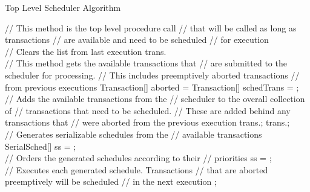 \begin{algorithm}
\caption{Top Level Scheduler Algorithm}
\label{alg:top_level}
\begin{algorithmic}[1]

  \State // This method is the top level procedure call
  \State // that will be called as long as transactions
  \State // are available and need to be scheduled
  \State // for execution
  \\
    \State // Clears the list from last execution
    \State trans.
    \\
    \State // This method gets the available transactions that
    \State // are submitted to the scheduler for processing.
    \State // This includes preemptively aborted transactions
    \State // from previous executions
    \State Transaction[] aborted = 
    \State Transaction[] schedTrans = ;
    \\
    \State // Adds the available transactions from the
    \State // scheduler to the overall collection of
    \State // transactions that need to be scheduled. 
    \State // These are added behind any transactions that
    \State // were aborted from the previous execution
    \State trans.;
    \State trans.;
    \\
    \State // Generates serializable schedules from the 
    \State // available transactions
    \State SerialSched[] ss = ;
    \\
    \State // Orders the generated schedules according to their
    \State // priorities
    \State ss = ;
    \\
    \State // Executes each generated schedule. Transactions
    \State // that are aborted preemptively will be scheduled
    \State // in the next execution
      \State {};
    \EndFor
  \EndWhile
\EndProcedure

\end{algorithmic}
\end{algorithm}